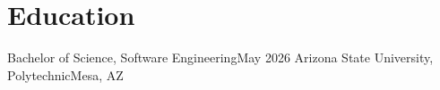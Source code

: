 \section{Education}
    \resumeSubHeadingListStart

    \resumeSubheading
    {Bachelor of Science, Software Engineering}{May 2026}
    {Arizona State University, Polytechnic}{Mesa, AZ}

    \resumeSubHeadingListEnd